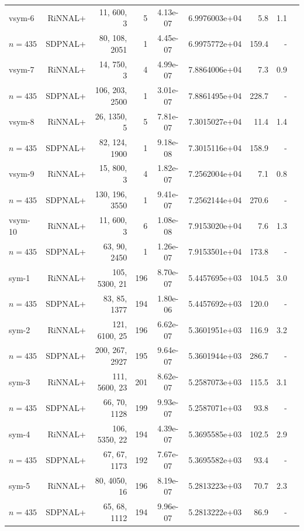 \documentclass[11pt]{article}
\theoremstyle{plain}
\begin{document}
\begin{footnotesize}
\begin{longtable}[c]{lrrrccrrr}
vsym-6& RiNNAL+ & 11, 600, 3 & 5 & 4.13e-07 & 6.9976003e+04 & 5.8 &1.1 \\ 
$n=435$ & SDPNAL+ & 80, 108, 2051 & 1& 4.45e-07 & 6.9975772e+04 & 159.4 & - \\ [3pt] 

vsym-7& RiNNAL+ & 14, 750, 3 & 4 & 4.99e-07 & 7.8864006e+04 & 7.3 &0.9 \\ 
$n=435$ & SDPNAL+ & 106, 203, 2500 & 1& 3.01e-07 & 7.8861495e+04 & 228.7 & - \\ [3pt] 

vsym-8& RiNNAL+ & 26, 1350, 5 & 5 & 7.81e-07 & 7.3015027e+04 & 11.4 &1.4 \\ 
$n=435$ & SDPNAL+ & 82, 124, 1900 & 1& 9.18e-08 & 7.3015116e+04 & 158.9 & - \\ [3pt] 

vsym-9& RiNNAL+ & 15, 800, 3 & 4 & 1.82e-07 & 7.2562004e+04 & 7.1 &0.8 \\ 
$n=435$ & SDPNAL+ & 130, 196, 3550 & 1& 9.41e-07 & 7.2562144e+04 & 270.6 & - \\ [3pt] 

vsym-10& RiNNAL+ & 11, 600, 3 & 6 & 1.08e-08 & 7.9153020e+04 & 7.6 &1.3 \\ 
$n=435$ & SDPNAL+ & 63, 90, 2450 & 1& 1.26e-07 & 7.9153501e+04 & 173.8 & - \\ [3pt] 

sym-1& RiNNAL+ & 105, 5300, 21 & 196 & 8.70e-07 & 5.4457695e+03 & 104.5 &3.0 \\ 
$n=435$ & SDPNAL+ & 83, 85, 1377 & 194& 1.80e-06 & 5.4457692e+03 & 120.0 & - \\ [3pt] 

sym-2& RiNNAL+ & 121, 6100, 25 & 196 & 6.62e-07 & 5.3601951e+03 & 116.9 &3.2 \\ 
$n=435$ & SDPNAL+ & 200, 267, 2927 & 195& 9.64e-07 & 5.3601944e+03 & 286.7 & - \\ [3pt] 

sym-3& RiNNAL+ & 111, 5600, 23 & 201 & 8.62e-07 & 5.2587073e+03 & 115.5 &3.1 \\ 
$n=435$ & SDPNAL+ & 66, 70, 1128 & 199& 9.93e-07 & 5.2587071e+03 & 93.8 & - \\ [3pt] 

sym-4& RiNNAL+ & 106, 5350, 22 & 194 & 4.39e-07 & 5.3695585e+03 & 102.5 &2.9 \\ 
$n=435$ & SDPNAL+ & 67, 67, 1173 & 192& 7.67e-07 & 5.3695582e+03 & 93.4 & - \\ [3pt] 

sym-5& RiNNAL+ & 80, 4050, 16 & 196 & 8.19e-07 & 5.2813223e+03 & 70.7 &2.3 \\ 
$n=435$ & SDPNAL+ & 65, 68, 1112 & 194& 9.96e-07 & 5.2813222e+03 & 86.9 & - \\ [3pt] 


\end{longtable}
\end{footnotesize}
\end{document}
